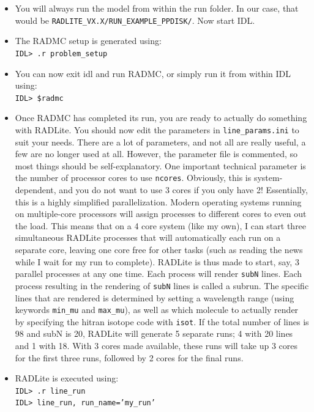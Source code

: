 \documentclass[11pt]{article}
\begin{document}
\begin{itemize}
\item You will always run the model from within the run folder. In our case, that would be {\tt RADLITE\_VX.X/RUN\_EXAMPLE\_PPDISK/}. 
Now start IDL. 

\item The RADMC setup is generated using: \\
{\tt IDL> .r problem\_setup}

\item You can now exit idl and run RADMC, or simply run it from within IDL using: \\
{\tt IDL> \$radmc}

\item Once RADMC has completed its run, you are ready to actually do something with RADLite. You should now edit the parameters in {\tt line\_params.ini} to suit your needs. 
There are a lot of parameters, and not all are really useful, a few are no longer used at all. However, the parameter file is commented, so
most things should be self-explanatory. One important technical parameter is the number of processor cores to use {\tt ncores}. Obviously, this
is system-dependent, and you do not want to use 3 cores if you only have 2! Essentially, this is a highly simplified parallelization. Modern operating systems
running on multiple-core processors will assign processes to different cores to even out the load. This means that on a 4 core system (like my own), I can
start three simultaneous RADLite processes that will automatically each run on a separate core, leaving one core free for other tasks (such as reading the news while
I wait for my run to complete). RADLite is thus made to start, say, 3 parallel processes at any one time. Each process will render {\tt subN} lines. Each 
process resulting in the rendering of {\tt subN} lines is called a subrun. The specific lines that are rendered
is determined by setting a wavelength range (using keywords {\tt min\_mu} and {\tt max\_mu}), as well as which molecule to actually render by specifying the hitran isotope code
with {\tt isot}. If the total number of lines is 98 and subN is 20, RADLite will generate 5 separate runs; 4 with 20 lines and 1 with 18. With 3 cores made available, these runs will 
take up 3 cores for the first three runs, followed by 2 cores for the final runs. 

\item RADLite is executed using: \\
{\tt IDL> .r line\_run}\\
{\tt IDL> line\_run, run\_name='my\_run'}\\


\end{itemize}
\end{document}
